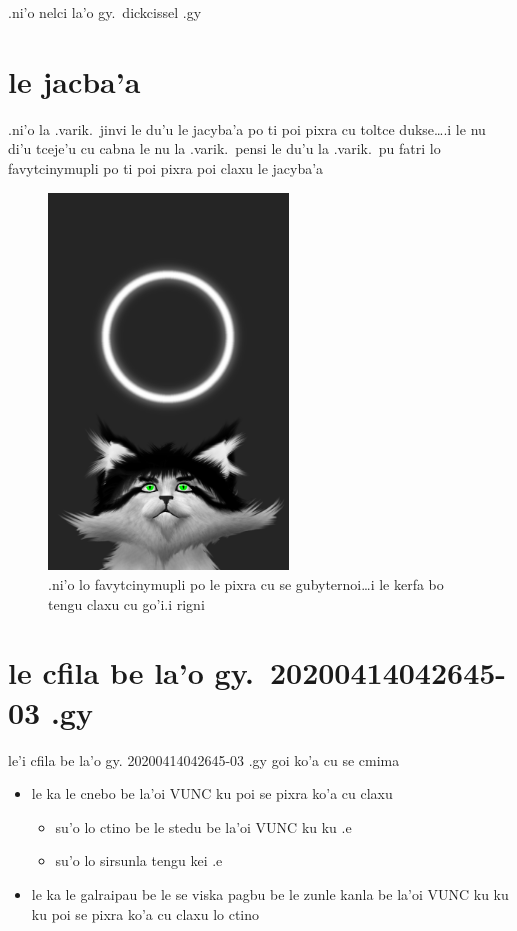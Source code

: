 \documentclass{report}
\begin{document}
.ni'o nelci la'o gy.\ dickcissel .gy

\section{le jacba'a}
.ni'o la .varik.\ jinvi le du'u le jacyba'a po ti poi pixra cu toltce dukse\ldots\@ .i le nu di'u tceje'u cu cabna le nu la .varik.\ pensi le du'u la .varik.\ pu fatri lo favytcinymupli po ti poi pixra poi claxu le jacyba'a

\begin{figure}[ht]
	\centering
	\includegraphics[height=10cm]{20200414042645-03/20200414042645-03-uw.png}
	\caption[center]{.ni'o lo favytcinymupli po le pixra cu se gubyternoi\ldots i le kerfa bo tengu claxu cu go'i\@  .i rigni}
\end{figure}

\section{le cfila be la'o gy.\ 20200414042645-03 .gy}
le'i cfila be la'o gy. 20200414042645-03 .gy goi ko'a cu se cmima
\begin{itemize}
	\item le ka le cnebo be la'oi VUNC ku poi se pixra ko'a cu claxu
	\begin{itemize}
		\item su'o lo ctino be le stedu be la'oi VUNC ku ku .e
		\item su'o lo sirsunla tengu kei .e
	\end{itemize}
	\item le ka le galraipau be le se viska pagbu be le zunle kanla be la'oi VUNC ku ku ku poi se pixra ko'a cu claxu lo ctino
\end{itemize}
\end{document}
